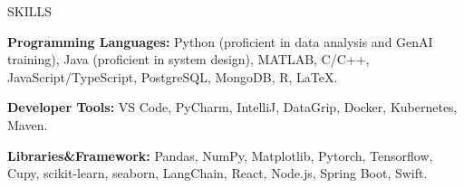 \begin{rSection}{SKILLS}
    \setlength{\parskip}{0pt}
    \setlength{\baselineskip}{-10pt}
    
    {\bf Programming Languages:} Python (proficient in data analysis and GenAI training), Java (proficient in system design), MATLAB, C/C++, JavaScript/TypeScript, PostgreSQL, MongoDB, R,  \LaTeX.
    
    \vspace{1pt}
    
    {\bf Developer Tools:} VS Code, PyCharm, IntelliJ, DataGrip, Docker, Kubernetes, Maven.
    
    \vspace{1pt}
    
    {\bf Libraries\&Framework:} Pandas, NumPy, Matplotlib, Pytorch, Tensorflow, Cupy, scikit-learn, seaborn, LangChain, React, Node.js, Spring Boot, Swift.
    
    
    \vspace{2pt}
\end{rSection}